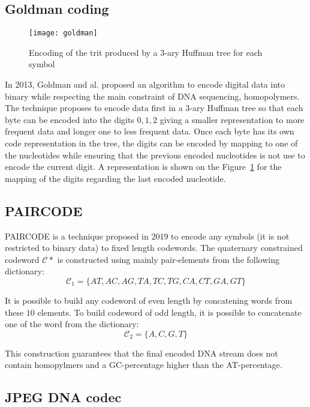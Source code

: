 
\subsection{Goldman coding}
\begin{figure}
    \centering
    \texttt{[image: goldman]}
    \caption{Encoding of the trit produced by a 3-ary Huffman tree for each symbol}
    \label{fig:goldman}
\end{figure}

In 2013, Goldman and al. \cite{bib:goldman} proposed an algorithm to encode digital data into binary while respecting the main constraint of DNA sequencing, homopolymers. 
The technique proposes to encode data first in a 3-ary Huffman tree so that each byte can be encoded into the digits $0,1,2$ giving a smaller representation to more frequent data and longer one to less frequent data. 
Once each byte has its own code representation in the tree, the digits can be encoded by mapping to one of the nucleotides while ensuring that the previous encoded nucleotides is not use to encode the current digit. A representation is shown on the Figure~\ref{fig:goldman} for the mapping of the digits regarding the last encoded nucleotide.

\subsection{PAIRCODE}

PAIRCODE \cite{bib:paircode} is a technique proposed in $2019$ to encode any symbols (it is not restricted to binary data) to fixed length codewords.
The quaternary constrained codeword $\mathcal{C}*$ is constructed using mainly pair-elements from the following dictionary:
$$
\mathcal{C}_1=\{AT,AC,AG,TA,TC,TG,CA,CT,GA,GT\}
$$

It is possible to build any codeword of even length by concatening words from these $10$ elements. To build codeword of odd length, it is possible to concatenate one of the word from the dictionary:
$$
\mathcal{C}_2=\{A,C,G,T\}
$$

This construction guarantees that the final encoded DNA stream does not contain homopylmers and a GC-percentage higher than the AT-percentage.



\subsection{JPEG DNA codec}
\label{subsec:jpegdna}

